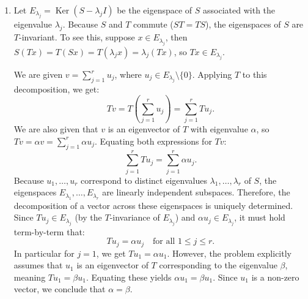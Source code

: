 \documentclass[10pt,a4paper]{article}
\begin{document}
\begin{enumerate}[label=\fbox{\arabic*}]
        \[
          \dim(\operatorname{Ker}(f) \cap \operatorname{Ker}(g)) = \begin{cases} 1, & \text{if } a = 2, \\ 0, & \text{if } a \neq 2. \end{cases}
        \]
        By the dimension formula for vector subspaces, $\dim(U + V) = \dim(U) + \dim(V) - \dim(U \cap V)$, we have:
        \[
          \dim(\operatorname{Ker}(f) + \operatorname{Ker}(g)) = 2 + 2 - \dim(\operatorname{Ker}(f) \cap \operatorname{Ker}(g)).
        \]
        Therefore:
        \[
          \dim(\operatorname{Ker}(f) + \operatorname{Ker}(g)) = \begin{cases} 3, & \text{if } a = 2, \\ 4, & \text{if } a \neq 2. \end{cases}
        \]

  \item %
        Let $E_{\lambda_j} = \operatorname{Ker}(S - \lambda_j I)$ be the eigenspace of $S$ associated with the eigenvalue $\lambda_j$. Because $S$ and $T$ commute ($ST = TS$), the eigenspaces of $S$ are $T$-invariant. To see this, suppose $x \in E_{\lambda_j}$, then $S(Tx) = T(Sx) = T(\lambda_j x) = \lambda_j(Tx)$, so $Tx \in E_{\lambda_j}$.
        
        We are given $v = \sum_{j=1}^r u_j$, where $u_j \in E_{\lambda_j} \setminus \{0\}$. Applying $T$ to this decomposition, we get:
        \[
          Tv = T\left(\sum_{j=1}^r u_j\right) = \sum_{j=1}^r T u_j.
        \]
        We are also given that $v$ is an eigenvector of $T$ with eigenvalue $\alpha$, so $Tv = \alpha v = \sum_{j=1}^r \alpha u_j$.
        Equating both expressions for $Tv$:
        \[
          \sum_{j=1}^r T u_j = \sum_{j=1}^r \alpha u_j.
        \]
        Because $u_1, \dots, u_r$ correspond to distinct eigenvalues $\lambda_1, \dots, \lambda_r$ of $S$, the eigenspaces $E_{\lambda_1}, \dots, E_{\lambda_r}$ are linearly independent subspaces. Therefore, the decomposition of a vector across these eigenspaces is uniquely determined.
        Since $T u_j \in E_{\lambda_j}$ (by the $T$-invariance of $E_{\lambda_j}$) and $\alpha u_j \in E_{\lambda_j}$, it must hold term-by-term that:
        \[
          T u_j = \alpha u_j \quad \text{for all } 1 \le j \le r.
        \]
        In particular for $j=1$, we get $Tu_1 = \alpha u_1$.
        However, the problem explicitly assumes that $u_1$ is an eigenvector of $T$ corresponding to the eigenvalue $\beta$, meaning $Tu_1 = \beta u_1$.
        Equating these yields $\alpha u_1 = \beta u_1$. Since $u_1$ is a non-zero vector, we conclude that $\alpha = \beta$.


\end{enumerate}
\end{document}
